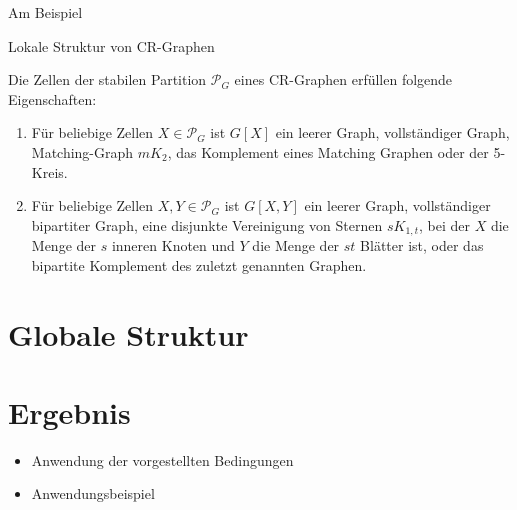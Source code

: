 \documentclass{beamer}
\begin{document}
\begin{frame}{Am Beispiel }
	\end{frame}
	\begin{frame}{Lokale Struktur von CR-Graphen}
		\begin{Lemma}
			Die Zellen der stabilen Partition $\mathcal{P}_G$ eines CR-Graphen erfüllen folgende Eigenschaften:
			
			\begin{enumerate}[label=(\Alph*)]
				\item Für beliebige Zellen $X\in \mathcal{P}_G$ ist $G[X]$ ein leerer Graph, vollständiger Graph, Matching-Graph $mK_2$, das Komplement eines Matching Graphen oder der 5-Kreis.
				\item Für beliebige Zellen $X,Y\in \mathcal{P}_G$ ist $G[X,Y]$ ein leerer Graph, vollständiger bipartiter Graph, eine disjunkte Vereinigung von Sternen $sK_{1,t}$, bei der $X$ die Menge der $s$ inneren Knoten und $Y$ die Menge der $st$ Blätter ist, oder das bipartite Komplement des zuletzt genannten Graphen.
			\end{enumerate}
		\end{Lemma}
	\end{frame}

	\section{Globale Struktur}
	
	\section{Ergebnis}
	\begin{frame}
		\begin{itemize}
			\item Anwendung der vorgestellten Bedingungen
			\item Anwendungsbeispiel
		\end{itemize}
	\end{frame}
\end{document}
